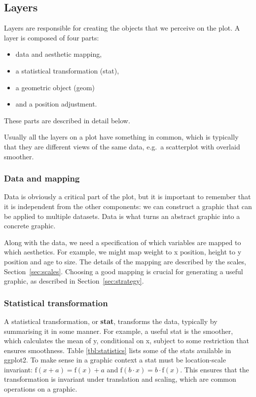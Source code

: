 \subsection{Layers}

Layers are responsible for creating the objects that we perceive on the plot.  A layer is composed of four parts:  

\begin{itemize}
  \item data and aesthetic mapping,
  \item a statistical transformation (stat), 
  \item a geometric object (geom)
  \item and a position adjustment.
\end{itemize}

\noindent These parts are described in detail below.

Usually all the layers on a plot have something in common, which is typically that they are different views of the same data, e.g.\ a scatterplot with overlaid smoother.  


\subsubsection{Data and mapping}\label{sub:data_and_mapping} 

Data is obviously a critical part of the plot, but it is important to remember that it is independent from the other components: we can construct a graphic that can be applied to multiple datasets. Data is what turns an abstract graphic into a concrete graphic.

Along with the data, we need a specification of which variables are mapped to which aesthetics.  For example, we might map weight to x position, height to y position and age to size.  The details of the mapping are described by the scales, Section~\ref{sec:scales}.  Choosing a good mapping is crucial for generating a useful graphic, as described in Section~\ref{sec:strategy}.

\subsubsection{Statistical transformation}\label{sub:stats} 

A statistical transformation, or {\bf stat}, transforms the data, typically by summarising it in some manner.  For example, a useful stat is the smoother, which calculates the mean of y, conditional on x, subject to some restriction that ensures smoothness. Table \ref{tbl:statistics} lists some of the stats available in ggplot2.  To make sense in a graphic context a stat must be location-scale invariant: $\mbox{f}(x + a) = \mbox{f}(x) + a$ and $\mbox{f}(b \cdot x) = b \cdot \mbox{f}(x)$.  This ensures that the transformation is invariant under translation and scaling, which are common operations on a graphic.

